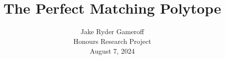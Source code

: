 \documentclass{beamer}
\title{\\ $ $ \\ $ $ \\ The Perfect Matching Polytope}
\author{Jake Ryder Gameroff \\ Honours Research Project \\ August 7, 2024}
\date{}
\begin{document}
\frame{\titlepage}



\end{document}
